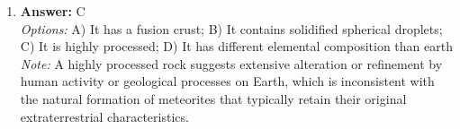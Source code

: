 \documentclass[12pt]{article}
\begin{document}
\begin{enumerate}[label=\arabic*.]
\\ \textit{Note:} The correct answer is based on the fact that brightness measurements during mutual eclipses of Pluto and Charon allow astronomers to determine the size of Pluto by analyzing the changes in light as one body passes in front of the other, providing accurate data on their relative sizes and distances.
\item \textbf{Answer:} C
\\ \textit{Options:} A) It has a fusion crust; B) It contains solidified spherical droplets; C) It is highly processed; D) It has different elemental composition than earth
\\ \textit{Note:} A highly processed rock suggests extensive alteration or refinement by human activity or geological processes on Earth, which is inconsistent with the natural formation of meteorites that typically retain their original extraterrestrial characteristics.
\end{enumerate}
\end{document}
